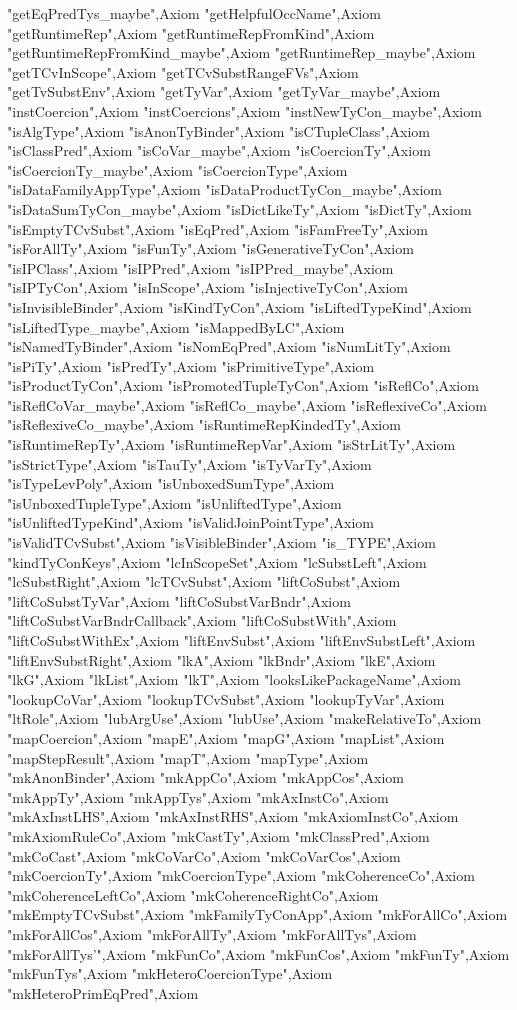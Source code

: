 {"getEqPredTys_maybe"},{Axiom "getHelpfulOccName"},{Axiom "getRuntimeRep"},{Axiom "getRuntimeRepFromKind"},{Axiom "getRuntimeRepFromKind_maybe"},{Axiom "getRuntimeRep_maybe"},{Axiom "getTCvInScope"},{Axiom "getTCvSubstRangeFVs"},{Axiom "getTvSubstEnv"},{Axiom "getTyVar"},{Axiom "getTyVar_maybe"},{Axiom "instCoercion"},{Axiom "instCoercions"},{Axiom "instNewTyCon_maybe"},{Axiom "isAlgType"},{Axiom "isAnonTyBinder"},{Axiom "isCTupleClass"},{Axiom "isClassPred"},{Axiom "isCoVar_maybe"},{Axiom "isCoercionTy"},{Axiom "isCoercionTy_maybe"},{Axiom "isCoercionType"},{Axiom "isDataFamilyAppType"},{Axiom "isDataProductTyCon_maybe"},{Axiom "isDataSumTyCon_maybe"},{Axiom "isDictLikeTy"},{Axiom "isDictTy"},{Axiom "isEmptyTCvSubst"},{Axiom "isEqPred"},{Axiom "isFamFreeTy"},{Axiom "isForAllTy"},{Axiom "isFunTy"},{Axiom "isGenerativeTyCon"},{Axiom "isIPClass"},{Axiom "isIPPred"},{Axiom "isIPPred_maybe"},{Axiom "isIPTyCon"},{Axiom "isInScope"},{Axiom "isInjectiveTyCon"},{Axiom "isInvisibleBinder"},{Axiom "isKindTyCon"},{Axiom "isLiftedTypeKind"},{Axiom "isLiftedType_maybe"},{Axiom "isMappedByLC"},{Axiom "isNamedTyBinder"},{Axiom "isNomEqPred"},{Axiom "isNumLitTy"},{Axiom "isPiTy"},{Axiom "isPredTy"},{Axiom "isPrimitiveType"},{Axiom "isProductTyCon"},{Axiom "isPromotedTupleTyCon"},{Axiom "isReflCo"},{Axiom "isReflCoVar_maybe"},{Axiom "isReflCo_maybe"},{Axiom "isReflexiveCo"},{Axiom "isReflexiveCo_maybe"},{Axiom "isRuntimeRepKindedTy"},{Axiom "isRuntimeRepTy"},{Axiom "isRuntimeRepVar"},{Axiom "isStrLitTy"},{Axiom "isStrictType"},{Axiom "isTauTy"},{Axiom "isTyVarTy"},{Axiom "isTypeLevPoly"},{Axiom "isUnboxedSumType"},{Axiom "isUnboxedTupleType"},{Axiom "isUnliftedType"},{Axiom "isUnliftedTypeKind"},{Axiom "isValidJoinPointType"},{Axiom "isValidTCvSubst"},{Axiom "isVisibleBinder"},{Axiom "is_TYPE"},{Axiom "kindTyConKeys"},{Axiom "lcInScopeSet"},{Axiom "lcSubstLeft"},{Axiom "lcSubstRight"},{Axiom "lcTCvSubst"},{Axiom "liftCoSubst"},{Axiom "liftCoSubstTyVar"},{Axiom "liftCoSubstVarBndr"},{Axiom "liftCoSubstVarBndrCallback"},{Axiom "liftCoSubstWith"},{Axiom "liftCoSubstWithEx"},{Axiom "liftEnvSubst"},{Axiom "liftEnvSubstLeft"},{Axiom "liftEnvSubstRight"},{Axiom "lkA"},{Axiom "lkBndr"},{Axiom "lkE"},{Axiom "lkG"},{Axiom "lkList"},{Axiom "lkT"},{Axiom "looksLikePackageName"},{Axiom "lookupCoVar"},{Axiom "lookupTCvSubst"},{Axiom "lookupTyVar"},{Axiom "ltRole"},{Axiom "lubArgUse"},{Axiom "lubUse"},{Axiom "makeRelativeTo"},{Axiom "mapCoercion"},{Axiom "mapE"},{Axiom "mapG"},{Axiom "mapList"},{Axiom "mapStepResult"},{Axiom "mapT"},{Axiom "mapType"},{Axiom "mkAnonBinder"},{Axiom "mkAppCo"},{Axiom "mkAppCos"},{Axiom "mkAppTy"},{Axiom "mkAppTys"},{Axiom "mkAxInstCo"},{Axiom "mkAxInstLHS"},{Axiom "mkAxInstRHS"},{Axiom "mkAxiomInstCo"},{Axiom "mkAxiomRuleCo"},{Axiom "mkCastTy"},{Axiom "mkClassPred"},{Axiom "mkCoCast"},{Axiom "mkCoVarCo"},{Axiom "mkCoVarCos"},{Axiom "mkCoercionTy"},{Axiom "mkCoercionType"},{Axiom "mkCoherenceCo"},{Axiom "mkCoherenceLeftCo"},{Axiom "mkCoherenceRightCo"},{Axiom "mkEmptyTCvSubst"},{Axiom "mkFamilyTyConApp"},{Axiom "mkForAllCo"},{Axiom "mkForAllCos"},{Axiom "mkForAllTy"},{Axiom "mkForAllTys"},{Axiom "mkForAllTys'"},{Axiom "mkFunCo"},{Axiom "mkFunCos"},{Axiom "mkFunTy"},{Axiom "mkFunTys"},{Axiom "mkHeteroCoercionType"},{Axiom "mkHeteroPrimEqPred"},{Axiom }
